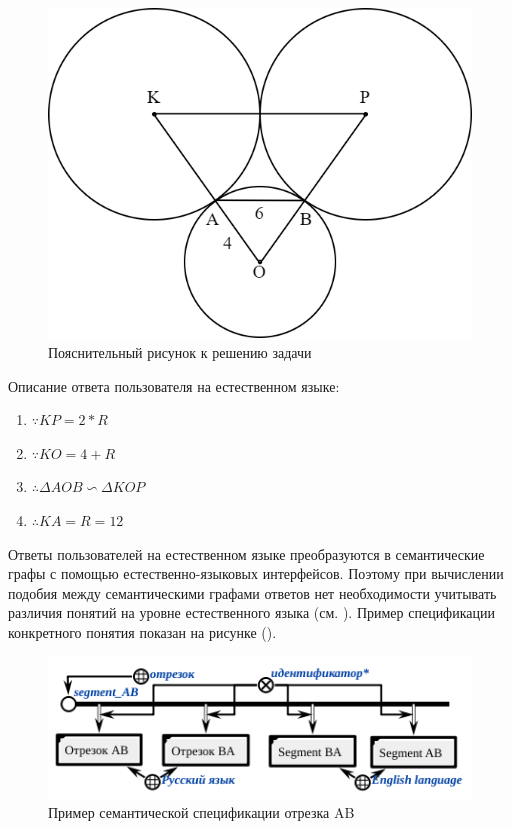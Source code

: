 \begin{figure}[H]
	\includegraphics[scale=0.3]{author/part7/figures/explanatory_illustration_example.png}
	\caption{Пояснительный рисунок к решению задачи}
	\label{fig:EI_example}
\end{figure}

Описание ответа пользователя на естественном языке:

\begin{enumerate}
	\item $\because KP = 2*R$
	\item $\because KO = 4+R$
	\item $\therefore \Delta A O B\backsim \Delta K O P$
	\item $\therefore K A = R = 12$
\end{enumerate}

Ответы пользователей на естественном языке преобразуются в семантические графы с помощью естественно-языковых интерфейсов. Поэтому при вычислении подобия между семантическими графами ответов нет необходимости учитывать различия понятий на уровне естественного языка (см. ). Пример спецификации конкретного понятия показан на рисунке (\textit{}).

\begin{figure}[H]
	\includegraphics[scale=0.8]{author/part7/figures/specification_segment_example.png}
	\caption{Пример семантической спецификации отрезка AB}
	\label{fig:SSE_example}
\end{figure}

